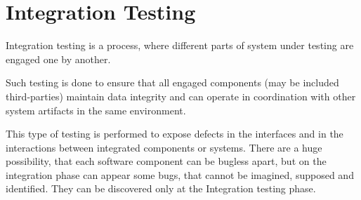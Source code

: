 \section{Integration Testing}
\label{sec:Integration Testing}

Integration testing is a process, where different parts of system under testing are engaged one by another.

Such testing is done to ensure that all engaged components (may be included third-parties) maintain data integrity and can operate in coordination with other system artifacts in the same environment.

This type of testing is performed to expose defects in the interfaces and in the interactions between integrated components or systems. There are a huge possibility, that each software component can be bugless apart, but on the integration phase can appear some bugs, that cannot be imagined, supposed and identified. They can be discovered only at the Integration testing phase.
